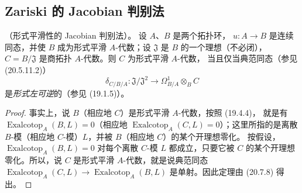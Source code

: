 \subsection{Zariski 的 Jacobian 判别法}
\label{subsection:0.22.6-fr}

\begin{theorem}[22.6.1]
\label{0.22.6.1-fr}
\textnormal{（形式平滑性的 Jacobian 判别法）。}
设 $A$、$B$ 是两个拓扑环，
$u:A\longrightarrow B$ 是连续同态，并使 $B$ 成为形式平滑
$A$-代数；设 $\mathfrak J$ 是 $B$ 的一个理想（不必闭），
$C=B/\mathfrak J$ 是商拓扑 $A$-代数。则 $C$ 为形式平滑 $A$-代数，
当且仅当典范同态（参见 (20.5.11.2)）
\begin{equation}
\label{0.22.6.1.1-fr}
  \delta_{C/B/A}:\mathfrak J/\mathfrak J^2
  \longrightarrow\Omega^1_{B/A}\otimes_BC
  \tag{22.6.1.1}
\end{equation}
是\emph{形式左可逆}的（参见 (19.1.5)）。
\end{theorem}

\begin{proof}
事实上，说 $B$（相应地 $C$）是形式平滑 $A$-代数，按照 (19.4.4)，
就是有
$\operatorname{Exalcotop}_A(B,L)=0$（相应地
$\operatorname{Exalcotop}_A(C,L)=0$）；这里所指的是离散
$B$-模（相应地 $C$-模）$L$，并被 $B$（相应地 $C$）的某个开理想零化。
按假设，$\operatorname{Exalcotop}_A(B,L)=0$ 对每个离散 $C$-模 $L$
都成立，只要它被 $C$ 的某个开理想零化。所以，说 $C$ 是形式平滑
$A$-代数，就是说典范同态
$\operatorname{Exalcotop}_A(C,L)\longrightarrow
\operatorname{Exalcotop}_A(B,L)$ 是单射。因此定理由 (20.7.8) 得出。
\end{proof}

